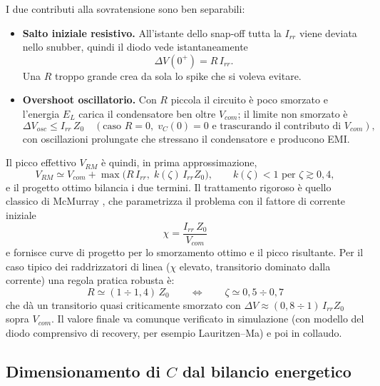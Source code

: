 \documentclass[11pt,a4paper]{article}
\begin{document}
I due contributi alla sovratensione sono ben separabili:
\begin{itemize}
\item \textbf{Salto iniziale resistivo.} All'istante dello snap-off tutta
la $I_{rr}$ viene deviata nello snubber, quindi il diodo vede
istantaneamente
\begin{equation}
\Delta V(0^+) = R\,I_{rr}.
\label{eq:IRstep}
\end{equation}
Una $R$ troppo grande crea da sola lo spike che si voleva evitare.
\item \textbf{Overshoot oscillatorio.} Con $R$ piccola il circuito \`e
poco smorzato e l'energia $E_L$ carica il condensatore ben oltre
$V_{com}$; il limite non smorzato \`e
\begin{equation}
\Delta V_{osc} \le I_{rr}\,Z_0 \quad (\text{caso } R=0,\; v_C(0)=0
\text{ e trascurando il contributo di } V_{com}),
\end{equation}
con oscillazioni prolungate che stressano il condensatore e producono
EMI.
\end{itemize}
Il picco effettivo $V_{RM}$ \`e quindi, in prima approssimazione,
\begin{equation}
V_{RM} \simeq V_{com} + \max\!\big(R\,I_{rr},\; k(\zeta)\, I_{rr} Z_0\big),
\qquad k(\zeta) < 1 \text{ per } \zeta \gtrsim 0{,}4,
\label{eq:VRM_stima}
\end{equation}
e il progetto ottimo bilancia i due termini. Il trattamento rigoroso \`e
quello classico di McMurray \cite{mcmurray}, che parametrizza il problema
con il fattore di corrente iniziale
\begin{equation}
\chi = \frac{I_{rr}\,Z_0}{V_{com}}
\end{equation}
e fornisce curve di progetto per lo smorzamento ottimo e il picco
risultante. Per il caso tipico dei raddrizzatori di linea ($\chi$ elevato,
transitorio dominato dalla corrente) una regola pratica robusta \`e:
\begin{equation}
\boxed{\;
R \simeq (1 \div 1{,}4)\,Z_0
\qquad\Longleftrightarrow\qquad
\zeta \simeq 0{,}5 \div 0{,}7
\;}
\label{eq:Rrule}
\end{equation}
che d\`a un transitorio quasi criticamente smorzato con
$\Delta V \approx (0{,}8\div 1)\,I_{rr}Z_0$ sopra $V_{com}$. Il valore
finale va comunque verificato in simulazione (con modello del diodo
comprensivo di recovery, per esempio Lauritzen--Ma) e poi in collaudo.

\subsection{Dimensionamento di $C$ dal bilancio energetico}
\end{document}
